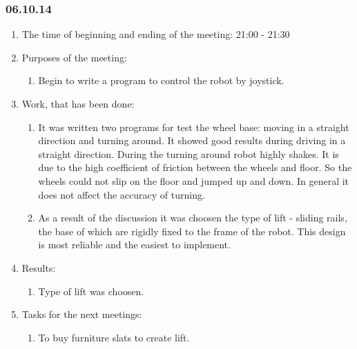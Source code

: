 \textsl{}
\subsubsection{06.10.14}

\begin{enumerate}
	\item The time of beginning and ending of the meeting:
	21:00 - 21:30
	\item Purposes of the meeting:
	\begin{enumerate}
	  \item Begin to write a program to control the robot by joystick.
	  
    \end{enumerate}
	\item Work, that has been done:
	\begin{enumerate}
	  \item It was written two programs for test the wheel base: moving in a straight direction and turning around. It showed good results during driving in a straight direction. During the turning around robot highly shakes. It is due to the high coefficient of friction between the wheels and floor. So the wheels could not slip on the floor and jumped up and down. In general it does not affect the accuracy of turning.
      
      \item  As a result of the discussion it was choosen the type of lift - sliding rails, the base of which are rigidly fixed to the frame of the robot. This design is most reliable and the easiest to implement.
      
    \end{enumerate}
    
	\item Results: 
	\begin{enumerate}
      \item  Type of lift was choosen.

    \end{enumerate}
    
	\item Tasks for the next meetings:
	\begin{enumerate}
	  \item To buy furniture slats to create lift.

    \end{enumerate}     
\end{enumerate}
\fillpage
